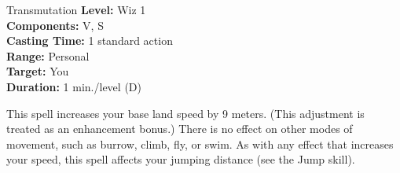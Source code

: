 {Transmutation}
{
	\textbf{Level:}
	Wiz 1\\
	\textbf{Components:}
	V, S\\
	\textbf{Casting Time:}
	1 standard action\\
	\textbf{Range:}
	Personal\\
	\textbf{Target:}
	You\\
	\textbf{Duration:}
	1 min./level (D)\\
}
{
	This spell increases your base land speed by 9 meters. (This adjustment is treated as an enhancement bonus.) There is no effect on other modes of movement, such as burrow, climb, fly, or swim. As with any effect that increases your speed, this spell affects your jumping distance (see the Jump skill).

}

